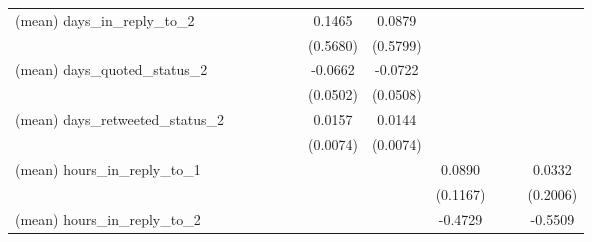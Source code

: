 {\begin{tabular}{l*{11}{c}}
(mean) days\_in\_reply\_to\_2&                     &                     &                     &                     &                     &      0.1465         &      0.0879         &                     &                     &                     &                     \\
                    &                     &                     &                     &                     &                     &    (0.5680)         &    (0.5799)         &                     &                     &                     &                     \\
(mean) days\_quoted\_status\_2&                     &                     &                     &                     &                     &     -0.0662         &     -0.0722         &                     &                     &                     &                     \\
                    &                     &                     &                     &                     &                     &    (0.0502)         &    (0.0508)         &                     &                     &                     &                     \\
(mean) days\_retweeted\_status\_2&                     &                     &                     &                     &                     &      0.0157\sym{**} &      0.0144\sym{*}  &                     &                     &                     &                     \\
                    &                     &                     &                     &                     &                     &    (0.0074)         &    (0.0074)         &                     &                     &                     &                     \\
(mean) hours\_in\_reply\_to\_1&                     &                     &                     &                     &                     &                     &                     &      0.0890         &                     &                     &      0.0332         \\
                    &                     &                     &                     &                     &                     &                     &                     &    (0.1167)         &                     &                     &    (0.2006)         \\
(mean) hours\_in\_reply\_to\_2&                     &                     &                     &                     &                     &                     &                     &     -0.4729         &                     &                     &     -0.5509         \\

\end{tabular}}
